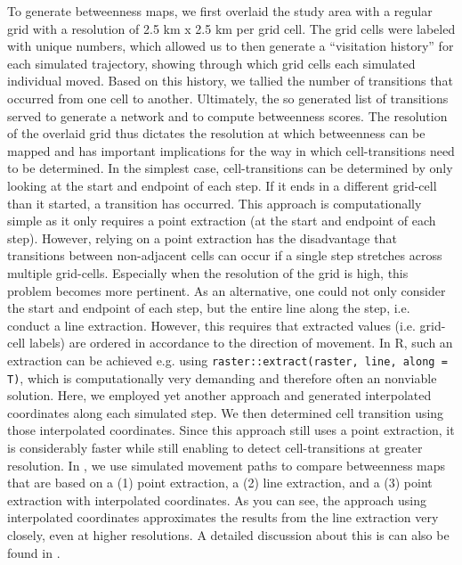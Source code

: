 \documentclass[../FinalThesis.tex]{subfiles}
\begin{document}
To generate betweenness maps, we first overlaid the study area with a regular
grid with a resolution of 2.5 km x 2.5 km per grid cell. The grid cells were
labeled with unique numbers, which allowed us to then generate a ``visitation
history'' for each simulated trajectory, showing through which grid cells each
simulated individual moved. Based on this history, we tallied the number of
transitions that occurred from one cell to another. Ultimately, the so generated
list of transitions served to generate a network and to compute betweenness
scores. The resolution of the overlaid grid thus dictates the resolution at
which betweenness can be mapped and has important implications for the way in
which cell-transitions need to be determined. In the simplest case,
cell-transitions can be determined by only looking at the start and endpoint of
each step. If it ends in a different grid-cell than it started, a transition has
occurred. This approach is computationally simple as it only requires a point
extraction (at the start and endpoint of each step). However, relying on a point
extraction has the disadvantage that transitions between non-adjacent cells can
occur if a single step stretches across multiple grid-cells. Especially when the
resolution of the grid is high, this problem becomes more pertinent. As an
alternative, one could not only consider the start and endpoint of each step,
but the entire line along the step, i.e. conduct a line extraction. However,
this requires that extracted values (i.e. grid-cell labels) are ordered in
accordance to the direction of movement. In R, such an extraction can be
achieved e.g. using \texttt{raster::extract(raster, line, along = T)}, which is
computationally very demanding and therefore often an nonviable solution. Here,
we employed yet another approach and generated interpolated coordinates along
each simulated step. We then determined cell transition using those interpolated
coordinates. Since this approach still uses a point extraction, it is
considerably faster while still enabling to detect cell-transitions at greater
resolution. In , we use simulated movement paths to
compare betweenness maps that are based on a (1) point extraction, a (2) line
extraction, and a (3) point extraction with interpolated coordinates. As you can
see, the approach using interpolated coordinates approximates the results from
the line extraction very closely, even at higher resolutions. A detailed
discussion about this is can also be found in \citep{Bastille-Rousseau.2018}.
\end{document}
